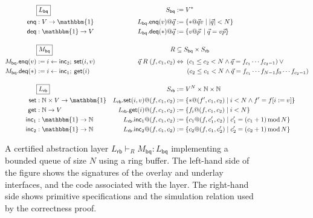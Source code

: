 \documentclass[draft,11pt]{report}
\newcommand{\kw}[1]{\ensuremath{ \mathsf{#1} }}
\begin{document}
\begin{figure*} %
  \begin{minipage}{.9\textwidth}
    \begin{align*}
      & \fbox{$L_\kw{bq}$} &
        S_\kw{bq} &:= V^* \\
      \kw{enq} &: V \rightarrow \mathbbm{1} &
        L_\kw{bq}.\kw{enq}(v)@\vec{q} &:= \{ * @ \vec{q} v \mid |\vec{q}| < N \} \\
      \kw{deq} &: \mathbbm{1} \rightarrow V &
        L_\kw{bq}.\kw{deq}(*)@\vec{q} &:= \{ v @ \vec{p} \: \mid \vec{q} = v \vec{p} \}
      \\[1em]
      & \fbox{$M_\kw{bq}$} &
        R &\subseteq S_\kw{bq} \times S_\kw{rb} \\
      M_\kw{bq}.\kw{enq}(v) &:= i \leftarrow \kw{inc}_2 ; \: \kw{set}(i, v) &
        \vec{q} \mathrel{R} (f, c_1, c_2) &\Leftrightarrow
        \: (c_1 \le c_2 < N \wedge
            \vec{q} = f_{c_1} \cdots f_{c_2-1}) \vee {}
      \\
      M_\kw{bq}.\kw{deq}(*) &:= i \leftarrow \kw{inc}_1 ; \: \kw{get}(i) &
        & \qquad \! (c_2 \le c_1 < N \wedge
            \vec{q} = f_{c_1} \cdots f_{N-1} f_0 \cdots f_{c_2 - 1})
      \\[1em]
      & \fbox{$L_\kw{rb}$} &
        S_\kw{rb} &:= V^N \times \mathbb{N} \times \mathbb{N}
      \\
      \kw{set} &: \mathbb{N} \times V \rightarrow \mathbbm{1} &
        L_\kw{rb}.\kw{set}(i, v)@(f, c_1, c_2) &:=
        \{ *@(f', c_1, c_2) \mid i < N \wedge f' = f[i := v] \}
      \\
      \kw{get} &: \mathbb{N} \rightarrow V &
        L_\kw{rb}.\kw{get}(i)@(f, c_1, c_2) &:=
        \{ f_i@(f, c_1, c_2) \mid i < N \}
      \\
      \kw{inc}_1 &: \mathbbm{1} \rightarrow \mathbb{N} &
        L_\kw{rb}.\kw{inc}_1@(f, c_1, c_2) &:=
        \{ c_1@(f, c_1', c_2) \mid
           c_1' = (c_1 + 1) \mathop{\mathrm{mod}} N \}
      \\
      \kw{inc}_2 &: \mathbbm{1} \rightarrow \mathbb{N} &
        L_\kw{rb}.\kw{inc}_2@(f, c_1, c_2) &:=
        \{ c_2@(f, c_1, c_2') \mid
           c_2' = (c_2 + 1) \mathop{\mathrm{mod}} N \}
    \end{align*}
  \end{minipage}
  \caption{A certified abstraction layer
    $L_\kw{rb} \vdash_R M_\kw{bq} : L_\kw{bq}$
    implementing a bounded queue of size $N$
    using a ring buffer.
    The left-hand side of the figure shows
    the signatures of the overlay and underlay interfaces,
    and the code associated with the layer.
    The right-hand side shows primitive specifications
    and the simulation relation used by the correctness proof.}
  \label{fig:cal}
\end{figure*}
\end{document}
